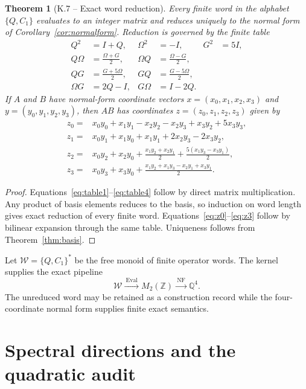 \documentclass[11pt,letterpaper]{article}
\theoremstyle{kernelstyle}
\newtheorem{theorem}{Theorem}[section]
\newcommand{\Qfield}{\mathbb{Q}}
\newcommand{\Z}{\mathbb{Z}}
\newcommand{\NF}{\operatorname{NF}}
\newcommand{\Eval}{\operatorname{Eval}}
\begin{document}
\begin{theorem}[K.7 -- Exact word reduction]\label{thm:word-reduction}
Every finite word in the alphabet $\{Q,C_1\}$ evaluates to an integer matrix and reduces uniquely to the normal form of Corollary~\ref{cor:normalform}.  Reduction is governed by the finite table
\begin{align}
 Q^2&=I+Q, & \Omega^2&=-I, & G^2&=5I,\label{eq:table1}\\
 Q\Omega&=\frac{\Omega+G}{2}, &
 \Omega Q&=\frac{\Omega-G}{2},\label{eq:table2}\\
 QG&=\frac{G+5\Omega}{2}, &
 GQ&=\frac{G-5\Omega}{2},\label{eq:table3}\\
 \Omega G&=2Q-I, &
 G\Omega&=I-2Q.\label{eq:table4}
\end{align}
If $A$ and $B$ have normal-form coordinate vectors $x=(x_0,x_1,x_2,x_3)$ and $y=(y_0,y_1,y_2,y_3)$, then $AB$ has coordinates $z=(z_0,z_1,z_2,z_3)$ given by
\begin{align}
 z_0={}&x_0y_0+x_1y_1-x_2y_2-x_2y_3+x_3y_2+5x_3y_3,\label{eq:z0}\\
 z_1={}&x_0y_1+x_1y_0+x_1y_1+2x_2y_3-2x_3y_2,\label{eq:z1}\\
 z_2={}&x_0y_2+x_2y_0+\frac{x_1y_2+x_2y_1}{2}
       +\frac{5(x_1y_3-x_3y_1)}{2},\label{eq:z2}\\
 z_3={}&x_0y_3+x_3y_0+\frac{x_1y_2+x_1y_3-x_2y_1+x_3y_1}{2}.
\label{eq:z3}
\end{align}
\end{theorem}

\begin{proof}
Equations~\eqref{eq:table1}--\eqref{eq:table4} follow by direct matrix multiplication.  Any product of basis elements reduces to the basis, so induction on word length gives exact reduction of every finite word.  Equations~\eqref{eq:z0}--\eqref{eq:z3} follow by bilinear expansion through the same table.  Uniqueness follows from Theorem~\ref{thm:basis}.
\end{proof}

\begin{resultbox}
Let $\mathcal W=\{Q,C_1\}^{*}$ be the free monoid of finite operator words.  The kernel supplies the exact pipeline
\[
\mathcal W
\xrightarrow{\ \Eval\ }
M_2(\Z)
\xrightarrow{\ \NF\ }
\Qfield^4.
\]
The unreduced word may be retained as a construction record while the four-coordinate normal form supplies finite exact semantics.
\end{resultbox}

\section{Spectral directions and the quadratic audit}\label{sec:spectral}
\end{document}
